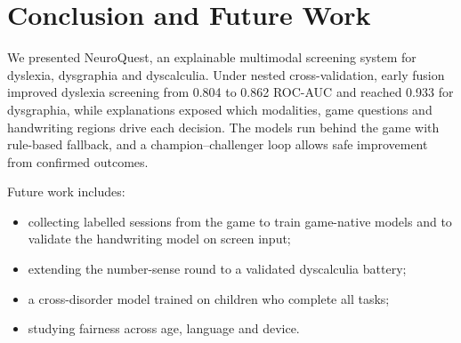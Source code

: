\documentclass[conference]{IEEEtran}
\begin{document}
\section{Conclusion and Future Work}
We presented NeuroQuest, an explainable multimodal screening system for dyslexia, dysgraphia and dyscalculia.
Under nested cross-validation, early fusion improved dyslexia screening from 0.804 to 0.862 ROC-AUC and reached
0.933 for dysgraphia, while explanations exposed which modalities, game questions and handwriting regions drive each
decision. The models run behind the game with rule-based fallback, and a champion--challenger loop allows safe
improvement from confirmed outcomes.

Future work includes:
\begin{itemize}
  \item collecting labelled sessions from the game to train game-native models and to validate the handwriting model
        on screen input;
  \item extending the number-sense round to a validated dyscalculia battery;
  \item a cross-disorder model trained on children who complete all tasks;
  \item studying fairness across age, language and device.
\end{itemize}
\end{document}
